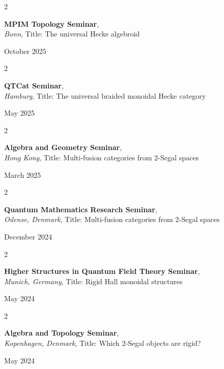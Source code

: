 \documentclass[10pt, letterpaper]{article}
\newenvironment{twocolentry}[2][]{
    \onecolentry
    \def\secondColumn{#2}
    \setcolumnwidth{\fill, 4.5 cm}
    \begin{paracol}{2}
}{
    \switchcolumn \raggedleft \secondColumn
    \end{paracol}
    \endonecolentry
} %
\begin{document}
 \vspace{0.2cm}


     \begin{twocolentry}{October 2025}
    \textbf{MPIM Topology Seminar},\\
    \textit{Bonn}, Title: The universal Hecke algebroid
    \end{twocolentry}
 \vspace{0.2cm}
    \begin{twocolentry}{May 2025}
    \textbf{QTCat Seminar},\\
    \textit{Hamburg}, Title: The universal braided monoidal Hecke category
    \end{twocolentry}

    \vspace{0.2cm}

    \begin{twocolentry}{March 2025}
    \textbf{Algebra and Geometry Seminar},\\
    \textit{Hong Kong}, Title: Multi-fusion categories from 2-Segal spaces
    \end{twocolentry}

    \vspace{0.2cm}
    
    \begin{twocolentry}
        {December 2024}
        \textbf{Quantum Mathematics Research Seminar},\\
        \textit{Odense, Denmark}, Title: Multi-fusion categories from 2-Segal spaces
    \end{twocolentry}

    \vspace{0.2cm}
        
        \begin{twocolentry}{

    May 2024
           
        }
            \textbf{Higher Structures in Quantum Field Theory Seminar}, \\
            \textit{Munich, Germany},  Title: Rigid Hall monoidal structures
            
           
        \end{twocolentry}
 \vspace{0.2cm}

\begin{twocolentry}{

    May 2024
           
        }
            \textbf{Algebra and Topology Seminar}, \\
            \textit{Kopenhagen, Denmark},  Title: Which 2-Segal objects are rigid?
            
           
        \end{twocolentry}
 
\end{document}
